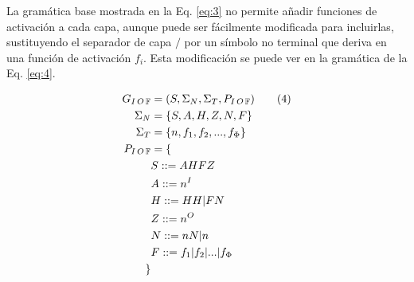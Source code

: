\documentclass[spanish,a4paper,12pt,twoside]{report}
\begin{document}
      La gramática base mostrada en la Eq. \ref{eq:3} no permite añadir funciones de activación a cada capa, aunque puede ser fácilmente modificada para incluirlas, sustituyendo el separador de capa $/$ por un símbolo no terminal que deriva en una función de activación $f_i$. Esta modificación se puede ver en la gramática de la Eq. \ref{eq:4}. \par
    \begin{align*}
      G_{I\thinspace O\thinspace \mathbb{F}} &= (S, \Sigma_{N}, \Sigma_{T}, P_{I\thinspace O\thinspace \mathbb{F}}) \label{eq:4}\tag{4} \\
      \Sigma_{N} &= \{S, A, H, Z, N, F\} \\
      \Sigma_{T} &= \{n, f_1, f_2, ..., f_{\Phi}\} \\
      P_{I\thinspace O\thinspace \mathbb{F}} &= \{ \\
      &S ::= AHFZ \\
      &A ::= n^I \\
      &H ::= HH | FN \\
      &Z ::= n^O \\
      &N ::= nN | n \\
      &F ::= f_1 | f_2 | ... | f_{\Phi} \\
      \}
      \end{align*}
  
  \newpage\cleardoublepage
  
\end{document}
